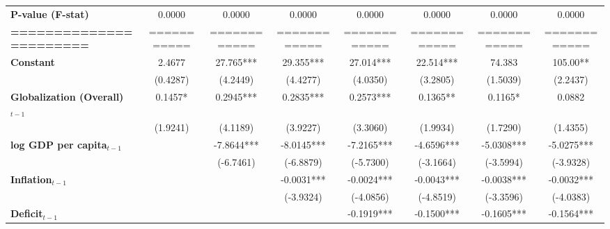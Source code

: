 \begin{center}
\begin{tabular}{lccccccc}
\textbf{P-value (F-stat)}          &       0.0000      &        0.0000        &           0.0000          &       0.0000       &      0.0000     &           0.0000          &            0.0000             \\
\textbf{=======================}   &    ===========    &     ============     &        ============       &    ============    &   ============  &        ============       &         ============          \\
\textbf{Constant}                     &       2.4677      &      27.765***       &         29.355***         &     27.014***      &    22.514***    &           74.383          &           105.00**            \\
\textbf{ }                         &      (0.4287)     &       (4.2449)       &          (4.4277)         &      (4.0350)      &     (3.2805)    &          (1.5039)         &           (2.2437)            \\
\textbf{Globalization (Overall)$_{t-1}$}               &      0.1457*      &      0.2945***       &         0.2835***         &     0.2573***      &     0.1365**    &          0.1165*          &            0.0882             \\
\textbf{ }                         &      (1.9241)     &       (4.1189)       &          (3.9227)         &      (3.3060)      &     (1.9934)    &          (1.7290)         &           (1.4355)            \\
\textbf{log GDP per capita$_{t-1}$}           &                   &      -7.8644***      &         -8.0145***        &     -7.2165***     &    -4.6596***   &         -5.0308***        &          -5.0275***           \\
\textbf{ }                         &                   &      (-6.7461)       &         (-6.8879)         &     (-5.7300)      &    (-3.1664)    &         (-3.5994)         &          (-3.9328)            \\
\textbf{Inflation$_{t-1}$}      &                   &                      &         -0.0031***        &     -0.0024***     &    -0.0043***   &         -0.0038***        &          -0.0032***           \\
\textbf{ }                         &                   &                      &         (-3.9324)         &     (-4.0856)      &    (-4.8519)    &         (-3.3596)         &          (-4.0383)            \\
\textbf{Deficit$_{t-1}$}             &                   &                      &                           &     -0.1919***     &    -0.1500***   &         -0.1605***        &          -0.1564***           \\

\end{tabular}
\end{center}
